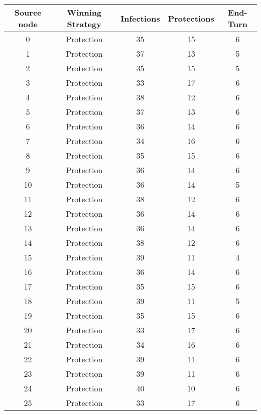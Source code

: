 \documentclass[results.tex]{subfiles}
\begin{document}
\begin{center}
  \begin{tabular}{| c || c | c | c | c |}
    \hline
    {\bfseries Source node} & {\bfseries Winning Strategy} & {\bfseries Infections} & {\bfseries Protections} & {\bfseries End-Turn} \\  %
    \hline\hline
    0 & Protection & 35 & 15 & 6 \\ 
    \hline
    1 & Protection & 37 & 13 & 5 \\ 
    \hline
    2 & Protection & 35 & 15 & 5 \\ 
    \hline
    3 & Protection & 33 & 17 & 6 \\ 
    \hline
    4 & Protection & 38 & 12 & 6 \\ 
    \hline
    5 & Protection & 37 & 13 & 6 \\ 
    \hline
    6 & Protection & 36 & 14 & 6 \\ 
    \hline
    7 & Protection & 34 & 16 & 6 \\ 
    \hline
    8 & Protection & 35 & 15 & 6 \\ 
    \hline
    9 & Protection & 36 & 14 & 6 \\ 
    \hline
    10 & Protection & 36 & 14 & 5 \\ 
    \hline
    11 & Protection & 38 & 12 & 6 \\ 
    \hline
    12 & Protection & 36 & 14 & 6 \\ 
    \hline
    13 & Protection & 36 & 14 & 6 \\ 
    \hline
    14 & Protection & 38 & 12 & 6 \\ 
    \hline
    15 & Protection & 39 & 11 & 4 \\ 
    \hline
    16 & Protection & 36 & 14 & 6 \\ 
    \hline
    17 & Protection & 35 & 15 & 6 \\ 
    \hline
    18 & Protection & 39 & 11 & 5 \\ 
    \hline
    19 & Protection & 35 & 15 & 6 \\ 
    \hline
    20 & Protection & 33 & 17 & 6 \\ 
    \hline
    21 & Protection & 34 & 16 & 6 \\ 
    \hline
    22 & Protection & 39 & 11 & 6 \\ 
    \hline
    23 & Protection & 39 & 11 & 6 \\ 
    \hline
    24 & Protection & 40 & 10 & 6 \\ 
    \hline
    25 & Protection & 33 & 17 & 6 \\ 

\end{tabular}
\end{center}
\end{document}
